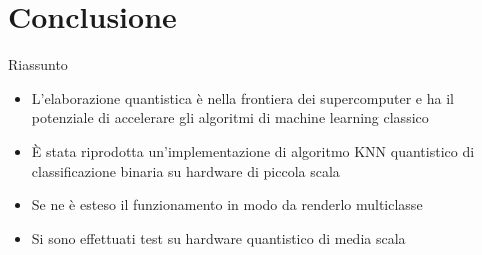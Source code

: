 \documentclass{beamer}
\begin{document}
    \section{Conclusione}

    \begin{frame}{Riassunto}
        \begin{itemize}
            \item L'elaborazione quantistica è nella frontiera dei supercomputer e ha il potenziale di accelerare gli algoritmi di machine learning classico
            \item È stata riprodotta un'implementazione di algoritmo KNN quantistico di classificazione binaria su hardware di piccola scala
            \item Se ne è esteso il funzionamento in modo da renderlo multiclasse
            \item Si sono effettuati test su hardware quantistico di media scala
        \end{itemize}
    \end{frame}
\end{document}
